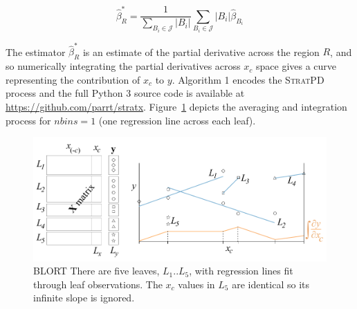 \documentclass[12pt]{article}
\newcommand{\figref}[1]{Figure~\ref{#1}}
\newcommand{\cut}[1]{}
\newcommand{\spd}{\fontfamily{cmr}\textsc{\small StratPD}}
\newcommand{\xnc}{$x_{\overline{c}}$}
\begin{document}
\begin{equation}\label{eq:slope}
\widehat{\beta}^{*}_R = \frac{1}{\displaystyle\sum_{B_i \in \mathcal{J}} |B_i|}\displaystyle\sum_{B_i \in \mathcal{J}}|B_i|\widehat{\beta}_{B_i}
\end{equation}

The estimator $\widehat{\beta}^{*}_R$ is an estimate of the partial derivative across the region $R$, and so numerically integrating the partial derivatives across $x_c$ space gives a curve representing the contribution of $x_c$ to $y$.  Algorithm 1 encodes the \spd{} process and the full Python 3 source code is available at {\small \url{https://github.com/parrt/stratx}}. \figref{fig:leaves} depicts the averaging and integration process for $nbins=1$ (one regression line across each leaf).  

\begin{figure}[htbp]
\begin{center}
\includegraphics[scale=0.7]{images/leaves.pdf}
\caption{BLORT There are five leaves, $L_1 .. L_5$, with regression lines fit through leaf observations. The $x_c$ values in $L_5$ are identical so its infinite slope is ignored.}
\label{fig:leaves}
\end{center}
\end{figure}

\cut{
\spd{} trains a decision tree in the usual way but on $(x_{\overline{c}}, {\bf y})$ rather than $({\bf X}, {\bf y})$. Observations $(X_i, y_i)$ that end up in a tree leaf are, by definition, in the same region of \xnc{} feature space. Training greedily partitions feature space in order to minimize variance of $y_i$ within regions, which partitions feature space into tighter and tighter regions.  (The collection of variable inequality decision nodes along the path from from root to a leaf demarcates the region of feature space.) Tighter regions imply more similar \xnc{} values, which means $x_c$ is likely responsible for any variation in $y$; this likelihood decreases as the size of $L$ increases.  The training process must leave at least two samples per leaf in order to fit a localized linear model.  
}
\end{document}
